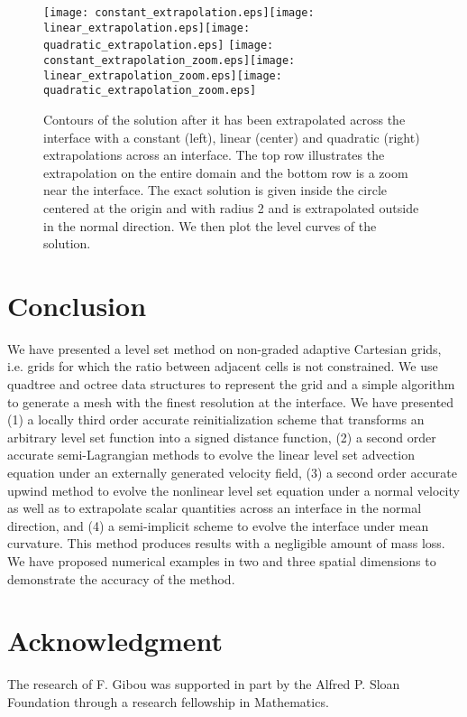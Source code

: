 \documentclass[english]{article}
\begin{document}
\begin{figure}
\begin{center}
\texttt{[image: constant\_extrapolation.eps]}\texttt{[image: linear\_extrapolation.eps]}\texttt{[image: quadratic\_extrapolation.eps]}
\texttt{[image: constant\_extrapolation\_zoom.eps]}\hspace{1cm}\texttt{[image: linear\_extrapolation\_zoom.eps]}\hspace{1cm}\texttt{[image: quadratic\_extrapolation\_zoom.eps]}
\end{center}
\caption{Contours of the solution after it has been extrapolated across the
interface with a constant (left), linear (center) and quadratic (right)
extrapolations across an interface. The top row illustrates the
extrapolation on the entire domain and the bottom row is a zoom near the
interface. The exact solution is given inside the circle centered at the
origin and with radius 2 and is extrapolated outside in the normal
direction. We then plot the level curves of the solution.}
\label{extrapolation_aslam}
\end{figure}


\section{Conclusion}
We have presented a level set method on non-graded adaptive Cartesian
grids, i.e. grids for which the ratio between adjacent cells is not
constrained. We use quadtree and octree data structures to represent the
grid and a simple algorithm to generate a mesh with the finest resolution
at the interface. We have presented (1) a locally third order accurate
reinitialization scheme that transforms an arbitrary level set function
into a signed distance function, (2) a second order accurate
semi-Lagrangian methods to evolve the linear level set advection equation
under an externally generated velocity field, (3) a second order accurate
upwind method to evolve the nonlinear level set equation under a normal
velocity as well as to extrapolate scalar quantities across an interface in
the normal direction, and (4) a semi-implicit scheme to evolve the
interface under mean curvature. This method produces results with a
negligible amount of mass loss. We have proposed numerical examples in two
and three spatial dimensions to demonstrate the accuracy of the method.

\section{Acknowledgment}
The research of F. Gibou was supported in part by the Alfred P. Sloan Foundation through a research
fellowship in Mathematics.
%
%

\end{document}
